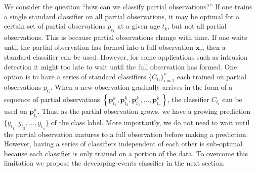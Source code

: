 \documentclass[11pt]{article}
\begin{document}
	We consider the question ``how can we classify partial observations?'' If one trains a single standard classifier on all partial observations, it may be optimal for a certain set of partial observations $p_{t_k}$ at a given age $t_k$, but not all partial observations. This is because partial observations change with time. If one waits until the partial observation has formed into a full observation $\mathbf{x}_j$, then a standard classifier can be used. However, for some applications such as intrusion detection it might  too late to wait until the full observation has formed. One option is to have a series of standard classifiers $\{C_{t_i}\}_{i=1}^n $  each trained on partial observations $p_{t_i}$. 	 When a new observation gradually arrives in the form of a sequence of partial observations $\left \{\mathbf{p}^k_{t_1},\mathbf{p}^k_{t_2}, \mathbf{p}^k_{t_3}, \ldots, \mathbf{p}^k_{t_n} \right \}$, the classifier $C_{t_i}$ can be used on $\mathbf{p}^k_{t_i}$. Thus, as the partial observation grows, we have a growing prediction $\{y_{t_1}, y_{t_2}, \ldots, y_{t_n}\}$ of the class label. More importantly, we do not need to wait until the partial observation matures to a full observation before making a prediction. However, having a series of classifiers independent of each other is sub-optimal because each classifier is only trained on a portion of the data. To overcome this limitation we propose the developing-events classifier in the next section. 
	
		
	
	
\end{document}
